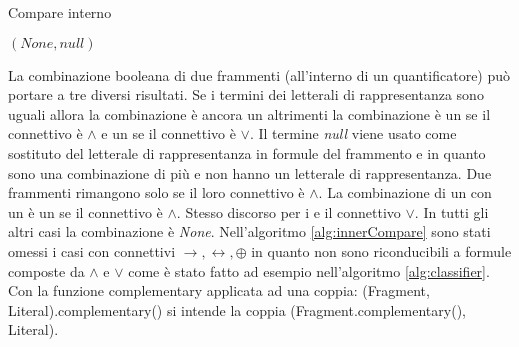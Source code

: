 \documentclass[./main.tex]{subfiles}
\begin{document}
\begin{algorithm}[H] \label{alg:innerCompare}
    \caption{Compare interno}




    \Return $(None, null)$\;
\end{algorithm}


La combinazione booleana di due frammenti \ob (all'interno di un quantificatore) può portare 
a tre diversi risultati.
Se i termini dei letterali di rappresentanza sono uguali allora la combinazione è ancora un \ob altrimenti 
la combinazione è un \cb se il connettivo è $\land$ e un \dbb se il connettivo è $\lor$. 
Il termine \textit{null} viene usato come sostituto del letterale di rappresentanza in formule del frammento \cb e \dbb in quanto 
sono una combinazione di più \ob e non hanno un letterale di rappresentanza.
Due frammenti \cb rimangono \cb solo se il loro connettivo è $\land$.
La combinazione di un \ob con un \cb è un \cb se il connettivo è $\land$. Stesso discorso per i \dbb e il connettivo $\lor$.
In tutti gli altri casi la combinazione è \textit{None}. 
Nell'algoritmo \ref{alg:innerCompare} sono stati omessi i casi con connettivi $\rightarrow, \leftrightarrow, \oplus$ 
in quanto non sono riconducibili a formule composte da $\land$ e $\lor$ come è stato fatto ad esempio nell'algoritmo \ref{alg:classifier}.
Con la funzione complementary applicata ad una coppia: (Fragment, Literal).complementary() si intende la coppia (Fragment.complementary(), Literal).
\end{document}
